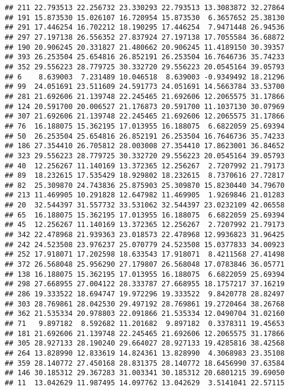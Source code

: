 \documentclass[
]{article}
\begin{document}
\begin{verbatim}
## 211 22.793513 22.256732 23.330293 22.793513 13.3083872 32.27864
## 191 15.873530 15.026107 16.720954 15.873530  6.3657652 25.38130
## 291 17.446254 16.702212 18.190295 17.446254  7.9471448 26.94536
## 297 27.197138 26.556352 27.837924 27.197138 17.7055584 36.68872
## 190 20.906245 20.331827 21.480662 20.906245 11.4189150 30.39357
## 393 26.253504 25.654816 26.852191 26.253504 16.7646736 35.74233
## 352 29.556223 28.779725 30.332720 29.556223 20.0545164 39.05793
## 6    8.639003  7.231489 10.046518  8.639003 -0.9349492 18.21296
## 99  24.051691 23.511609 24.591773 24.051691 14.5663784 33.53700
## 281 21.692606 21.139748 22.245465 21.692606 12.2065575 31.17866
## 124 20.591700 20.006527 21.176873 20.591700 11.1037130 30.07969
## 307 21.692606 21.139748 22.245465 21.692606 12.2065575 31.17866
## 76  16.188075 15.362195 17.013955 16.188075  6.6822059 25.69394
## 50  26.253504 25.654816 26.852191 26.253504 16.7646736 35.74233
## 186 27.354410 26.705812 28.003008 27.354410 17.8623001 36.84652
## 323 29.556223 28.779725 30.332720 29.556223 20.0545164 39.05793
## 40  12.256267 11.140169 13.372365 12.256267  2.7207992 21.79173
## 89  18.232615 17.535429 18.929802 18.232615  8.7370616 27.72817
## 82  25.309870 24.743836 25.875903 25.309870 15.8230440 34.79670
## 213 11.469905 10.291828 12.647982 11.469905  1.9269846 21.01283
## 20  32.544397 31.557732 33.531062 32.544397 23.0232109 42.06558
## 65  16.188075 15.362195 17.013955 16.188075  6.6822059 25.69394
## 45  12.256267 11.140169 13.372365 12.256267  2.7207992 21.79173
## 342 22.478968 21.939363 23.018573 22.478968 12.9936823 31.96425
## 242 24.523508 23.976237 25.070779 24.523508 15.0377833 34.00923
## 252 17.918071 17.202598 18.633543 17.918071  8.4211568 27.41498
## 372 26.568048 25.956290 27.179807 26.568048 17.0783846 36.05771
## 138 16.188075 15.362195 17.013955 16.188075  6.6822059 25.69394
## 298 27.668955 27.004122 28.333787 27.668955 18.1757217 37.16219
## 286 19.333522 18.694747 19.972296 19.333522  9.8420778 28.82497
## 303 28.769861 28.042530 29.497192 28.769861 19.2720464 38.26768
## 362 21.535334 20.978803 22.091866 21.535334 12.0490704 31.02160
## 71   9.897182  8.592682 11.201682  9.897182  0.3378311 19.45653
## 181 21.692606 21.139748 22.245465 21.692606 12.2065575 31.17866
## 305 28.927133 28.190240 29.664027 28.927133 19.4285816 38.42568
## 264 13.828990 12.833619 14.824361 13.828990  4.3068983 23.35108
## 359 28.140772 27.450168 28.831375 28.140772 18.6456990 37.63584
## 146 30.185312 29.367283 31.003341 30.185312 20.6801215 39.69050
## 11  13.042629 11.987495 14.097762 13.042629  3.5141041 22.57115

\end{verbatim}
\end{document}
